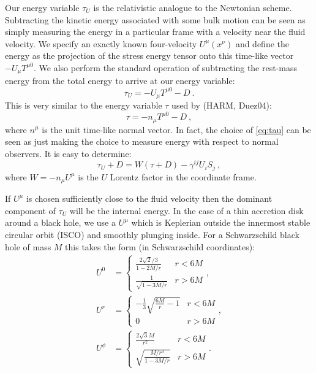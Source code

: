 \documentclass{emulateapj}
\begin{document}
Our energy variable $\tau_U$ is the relativistic analogue to the Newtonian scheme.  Subtracting the kinetic energy associated with some bulk motion can be seen as simply measuring the energy in a particular frame with a velocity near the fluid velocity. We specify an exactly known four-velocity $U^\mu(x^\nu)$ and define the energy as the projection of the stress energy tensor onto this time-like vector $-U_\mu T^{\mu 0}$.  We also perform the standard operation of subtracting the rest-mass energy from the total energy to arrive at our energy variable:
\begin{equation}
	\tau_U = -U_\mu T^{\mu 0} - D \ . \label{eq:tauU}
\end{equation}
This is very similar to the energy variable $\tau$ used by (HARM, Duez04):
\begin{equation}
	\tau = -n_\mu T^{\mu 0} - D \ , \label{eq:tau}
\end{equation}
where $n^\mu$ is the unit time-like normal vector. In fact, the choice of \eqref{eq:tau} can be seen as just making the choice to measure energy with respect to normal observers.  It is easy to determine: %
\begin{equation}
\tau_U + D = W\left(\tau + D\right) - \gamma^{ij}U_i S_j  \ ,
\end{equation}
where $W = -n_\mu U^\mu$ is the $U$ Lorentz factor in the coordinate frame.

If $U^\mu$ is chosen sufficiently close to the fluid velocity then the dominant component of $\tau_U$ will be the internal energy.  In the case of a thin accretion disk around a black hole, we use a $U^\mu$ which is Keplerian outside the innermost stable circular orbit (ISCO) and smoothly plunging inside.  For a Schwarzschild black hole of mass $M$ this takes the form (in Schwarzschild coordinates):
\begin{align}
	U^0 &= \left \{ \begin{matrix} \frac{2\sqrt{2}/3}{1-2M/r} & r < 6M \\
						\frac{1}{\sqrt{1-3M/r}} & r > 6M \end{matrix} \right . , \nonumber \\
	U^r &= \left \{ \begin{matrix} -\frac{1}{3}\sqrt{\frac{6M}{r}-1} & r < 6M \\
						0 & r > 6M \end{matrix} \right . , \nonumber \\
	U^\phi &= \left \{ \begin{matrix}  \frac{2 \sqrt{3} M}{r^2} & r < 6M \\
						\sqrt{\frac{M/r^3}{1-3M/r}} & r > 6M \end{matrix} \right . . \label{eq:Ugeo}
\end{align}
\end{document}
